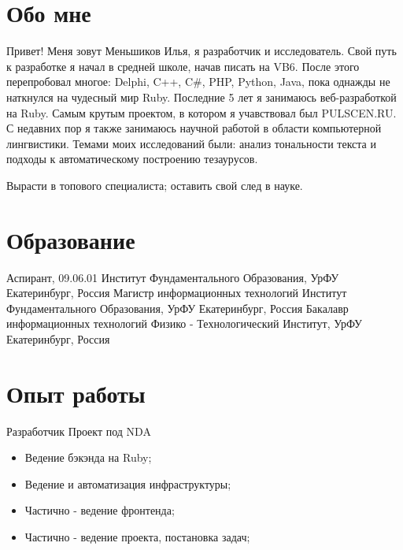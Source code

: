 \documentclass[11pt,a4paper]{moderncv}
\begin{document}
\maketitle

\section{Обо мне}
 {
  Привет! Меня зовут Меньшиков Илья, я разработчик и исследователь. Свой путь к разработке я начал в средней школе, начав писать на VB6. После этого перепробовал многое: Delphi, C++, C\#, PHP, Python, Java, пока однажды не наткнулся на чудесный мир Ruby.
}
\cvitem{} {
  Последние 5 лет я занимаюсь веб-разработкой на Ruby. Самым крутым проектом, в котором я учавствовал был PULSCEN.RU.
}
\cvitem{} {
  С недавних пор я также занимаюсь научной работой в области компьютерной лингвистики. Темами моих исследований были: анализ тональности текста и подходы к автоматическому построению тезаурусов.
}

 {
  Вырасти в топового специалиста; оставить свой след в науке.
}



\section{Образование}


  {Аспирант, 09.06.01}
  {Институт Фундаментального Образования, УрФУ}
  {Екатеринбург, Россия}
{}{}
  {Магистр информационных технологий}
  {Институт Фундаментального Образования, УрФУ}
  {Екатеринбург, Россия}
{}{}
  {Бакалавр информационных технологий}
  {Физико - Технологический Институт, УрФУ}
  {Екатеринбург, Россия}
{}{}

\section{Опыт работы}

  {Разработчик}{}
  {Проект под NDA}
  {}
{
\begin{itemize}
  \item Ведение бэкэнда на Ruby;
  \item Ведение и автоматизация инфраструктуры;
  \item Частично - ведение фронтенда;
  \item Частично - ведение проекта, постановка задач;
\end{itemize}
}
\end{document}
